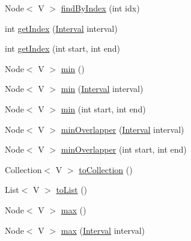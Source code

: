 \begin{DoxyCompactItemize}
Node$<$ V $>$ \hyperlink{classbroad_1_1core_1_1datastructures_1_1_interval_tree_3_01_v_01_4_afdd8be86b5697cd31f52f361e198966c}{find\+By\+Index} (int idx)
\item 
int \hyperlink{classbroad_1_1core_1_1datastructures_1_1_interval_tree_3_01_v_01_4_a87fa030b462c169a7cb7ec515d652170}{get\+Index} (\hyperlink{interfacebroad_1_1core_1_1datastructures_1_1_interval}{Interval} interval)
\item 
int \hyperlink{classbroad_1_1core_1_1datastructures_1_1_interval_tree_3_01_v_01_4_a34aa2e3925eb94ef7f5003a67c99738f}{get\+Index} (int start, int end)
\item 
Node$<$ V $>$ \hyperlink{classbroad_1_1core_1_1datastructures_1_1_interval_tree_3_01_v_01_4_a2bc0b97c96c61daeb3c731e6a9864d42}{min} ()
\item 
Node$<$ V $>$ \hyperlink{classbroad_1_1core_1_1datastructures_1_1_interval_tree_3_01_v_01_4_ade7a80aa74915e1b4f8a5b8dcb394432}{min} (\hyperlink{interfacebroad_1_1core_1_1datastructures_1_1_interval}{Interval} interval)
\item 
Node$<$ V $>$ \hyperlink{classbroad_1_1core_1_1datastructures_1_1_interval_tree_3_01_v_01_4_afb256be8bad31ae13609e8ee6fc02c64}{min} (int start, int end)
\item 
Node$<$ V $>$ \hyperlink{classbroad_1_1core_1_1datastructures_1_1_interval_tree_3_01_v_01_4_a8327871565ee42bd38cfda44240591c5}{min\+Overlapper} (\hyperlink{interfacebroad_1_1core_1_1datastructures_1_1_interval}{Interval} interval)
\item 
Node$<$ V $>$ \hyperlink{classbroad_1_1core_1_1datastructures_1_1_interval_tree_3_01_v_01_4_a7793c8a726674cf9cde66f3f8284380a}{min\+Overlapper} (int start, int end)
\item 
Collection$<$ V $>$ \hyperlink{classbroad_1_1core_1_1datastructures_1_1_interval_tree_3_01_v_01_4_acc986eeafe49f241ec91e282428d2552}{to\+Collection} ()
\item 
List$<$ V $>$ \hyperlink{classbroad_1_1core_1_1datastructures_1_1_interval_tree_3_01_v_01_4_a09d6ecabba84eec53d01512887fdb06b}{to\+List} ()
\item 
Node$<$ V $>$ \hyperlink{classbroad_1_1core_1_1datastructures_1_1_interval_tree_3_01_v_01_4_a166ddc864c75c2ce9bd5459400db5a71}{max} ()
\item 
Node$<$ V $>$ \hyperlink{classbroad_1_1core_1_1datastructures_1_1_interval_tree_3_01_v_01_4_a9531b81beb8655f40e89f47ad20ee730}{max} (\hyperlink{interfacebroad_1_1core_1_1datastructures_1_1_interval}{Interval} interval)
\item 

\end{DoxyCompactItemize}
